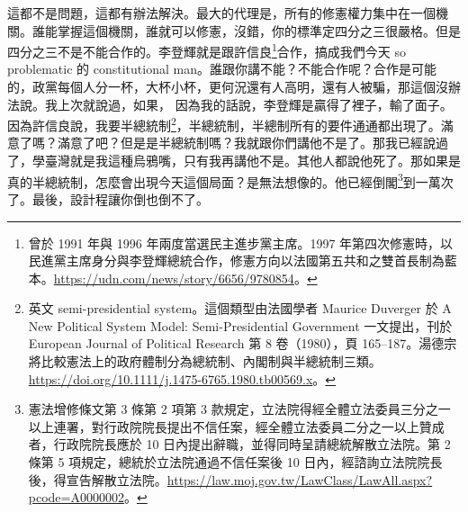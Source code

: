 \hypertarget{w05:cue:338}{}這都不是問題，這都有辦法解決。最大的代理是，所有的修憲權力集中在一個機關。誰能掌握這個機關，誰就可以修憲，沒錯，你的標準定四分之三很嚴格。但是四分之三不是不能合作的。李登輝就是跟許信良\footnote{曾於 1991 年與 1996 年兩度當選民主進步黨主席。1997 年第四次修憲時，以民進黨主席身分與李登輝總統合作，修憲方向以法國第五共和之雙首長制為藍本。\url{https://udn.com/news/story/6656/9780854}。}合作，搞成我們今天 so problematic 的 constitutional man。誰跟你講不能？不能合作呢？合作是可能的，政黨每個人分一杯，大杯小杯，更何況還有人高明，還有人被騙，那這個沒辦法說。我上次就說過，如果，
\hypertarget{w05:cue:339}{}因為我的話說，李登輝是贏得了裡子，輸了面子。因為許信良說，我要半總統制\footnote{英文 semi-presidential system。這個類型由法國學者 Maurice Duverger 於 A New Political System Model: Semi-Presidential Government 一文提出，刊於 European Journal of Political Research 第 8 卷（1980），頁 165–187。湯德宗將比較憲法上的政府體制分為總統制、內閣制與半總統制三類。\url{https://doi.org/10.1111/j.1475-6765.1980.tb00569.x}。}，半總統制，半總制所有的要件通通都出現了。滿意了嗎？滿意了吧？但是是半總統制嗎？我就跟你們講他不是了。那我已經說過了，學臺灣就是我這種烏鴉嘴，只有我再講他不是。其他人都說他死了。那如果是真的半總統制，怎麼會出現今天這個局面？是無法想像的。他已經倒閣\footnote{憲法增修條文第 3 條第 2 項第 3 款規定，立法院得經全體立法委員三分之一以上連署，對行政院院長提出不信任案，經全體立法委員二分之一以上贊成者，行政院院長應於 10 日內提出辭職，並得同時呈請總統解散立法院。第 2 條第 5 項規定，總統於立法院通過不信任案後 10 日內，經諮詢立法院院長後，得宣告解散立法院。\url{https://law.moj.gov.tw/LawClass/LawAll.aspx?pcode=A0000002}。}到一萬次了。最後，設計程讓你倒也倒不了。

